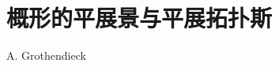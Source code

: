 \setcounter{chapter}{6}
\chapter{概形的平展景与平展拓扑斯}
\begin{center}
A. Grothendieck
\end{center}
\label{sga4.exp.VII}

